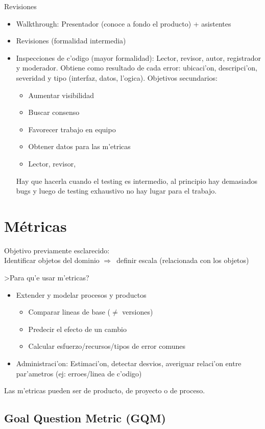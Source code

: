 \documentclass[a4paper,spanish]{article}
\newcommand{\then}[0]{\ensuremath{\Rightarrow}~}
\newenvironment{items}{
		\vspace*{-\topsep}
		\begin{itemize} 
		\addtolength{\itemsep}{-0.5\baselineskip}
		}{\end{itemize}\vspace*{-\topsep}}
\begin{document}
Revisiones
\begin{items}
\item Walkthrough: Presentador (conoce a fondo el producto) + asistentes
\item Revisiones (formalidad intermedia)
\item Inspecciones de c'odigo (mayor formalidad): Lector, revisor, autor, 
	registrador y moderador. Obtiene como resultado de cada error: ubicaci'on,
	descripci'on, severidad y tipo (interfaz, datos, l'ogica). Objetivos
	secundarios:
	\begin{items}
	\item Aumentar visibilidad
	\item Buscar consenso
	\item Favorecer trabajo en equipo
	\item Obtener datos para las m'etricas
	\item Lector, revisor, 
	\end{items}
	Hay que hacerla cuando el testing es intermedio, al principio hay 
	demasiados bugs y luego de testing exhaustivo no hay lugar para el 
	trabajo.
\end{items}

\section{M\'etricas}

Objetivo previamente esclarecido: \\
Identificar objetos del dominio \then definir escala (relacionada con los 
	objetos)

>Para qu'e usar m'etricas?
\begin{items}
\item Extender y modelar procesos y productos
	\begin{items}
	\item Comparar lineas de base ($\neq$ versiones)
	\item Predecir el efecto de un cambio
	\item Calcular esfuerzo/recursos/tipos de error comunes
	\end{items}
\item Administraci'on: Estimaci'on, detectar desvios, averiguar relaci'on 
	entre par'ametros (ej: erroes/linea de c'odigo)
\end{items}

Las m'etricas pueden ser de producto, de proyecto o de proceso.

\subsection{Goal Question Metric (GQM)}
\end{document}
